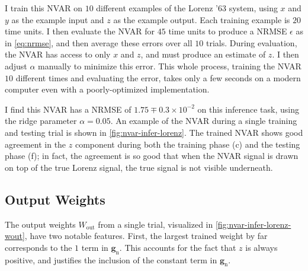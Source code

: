 I train this NVAR on $10$ different examples of the Lorenz '63
system, using $x$ and $y$ as the example input and $z$ as the example
output. Each training example is $20$ time units. I then evaluate
the NVAR for $45$ time units to produce a NRMSE $\epsilon$ as in
\cref{eq:nrmse}, and then average these errors over all $10$
trials. During evaluation, the NVAR has access to only $x$ and $z$,
and must produce an estimate of $z$. I then adjust $\alpha$ manually
to minimize this error. This whole process, training the NVAR $10$
different times and evaluating the error, takes only a few seconds on
a modern computer even with a poorly-optimized implementation.

I find this NVAR has a NRMSE of $1.75\mp0.3\times10^{-2}$ on this
inference task, using the ridge parameter $\alpha = 0.05$. An example
of the NVAR during a single training and testing trial is shown in
\cref{fig:nvar-infer-lorenz}. The trained NVAR shows good agreement in
the $z$ component during both the training phase (c) and the testing
phase (f); in fact, the agreement is so good that when the NVAR signal is
drawn on top of the true Lorenz signal, the true signal is not visible
underneath.

\subsection{Output Weights}\label{sec:nvar-infer-weights}

The output weights $W_\text{out}$ from a single trial, visualized in
\cref{fig:nvar-infer-lorenz-wout}, have two notable features. First,
the largest trained weight by far corresponds to the $1$ term in
$\bm{g}_\text{n}$. This accounts for the fact that $z$ is always
positive, and justifies the inclusion of the constant term in
$\bm{g}_\text{n}$.


